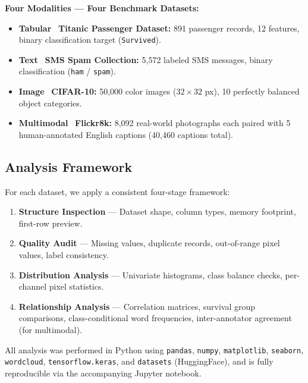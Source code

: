 \begin{importantbox}
\textbf{Four Modalities — Four Benchmark Datasets:}
\begin{itemize}
    \item \textbf{Tabular} \textrightarrow\ \textbf{Titanic Passenger Dataset:} 891 passenger records, 12 features, binary classification target (\texttt{Survived}).
    \item \textbf{Text} \textrightarrow\ \textbf{SMS Spam Collection:} 5{,}572 labeled SMS messages, binary classification (\texttt{ham} / \texttt{spam}).
    \item \textbf{Image} \textrightarrow\ \textbf{CIFAR-10:} 50{,}000 color images ($32{\times}32$ px), 10 perfectly balanced object categories.
    \item \textbf{Multimodal} \textrightarrow\ \textbf{Flickr8k:} 8{,}092 real-world photographs each paired with 5 human-annotated English captions (40{,}460 captions total).
\end{itemize}
\end{importantbox}

\subsection*{Analysis Framework}

For each dataset, we apply a consistent four-stage framework:

\begin{enumerate}
    \item \textbf{Structure Inspection} — Dataset shape, column types, memory footprint, first-row preview.
    \item \textbf{Quality Audit} — Missing values, duplicate records, out-of-range pixel values, label consistency.
    \item \textbf{Distribution Analysis} — Univariate histograms, class balance checks, per-channel pixel statistics.
    \item \textbf{Relationship Analysis} — Correlation matrices, survival group comparisons, class-conditional word frequencies, inter-annotator agreement (for multimodal).
\end{enumerate}

All analysis was performed in Python using \texttt{pandas}, \texttt{numpy}, \texttt{matplotlib}, \texttt{seaborn}, \texttt{wordcloud}, \texttt{tensorflow.keras}, and \texttt{datasets} (HuggingFace), and is fully reproducible via the accompanying Jupyter notebook.
